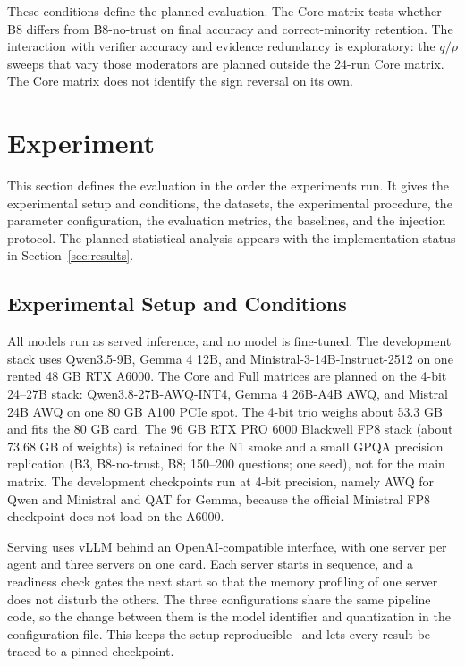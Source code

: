 \documentclass[a4paper,fleqn]{cas-sc}
\begin{document}
These conditions define the planned evaluation. The Core matrix tests whether B8 differs from B8-no-trust on final accuracy and correct-minority retention. The interaction with verifier accuracy and evidence redundancy is exploratory: the $q/\rho$ sweeps that vary those moderators are planned outside the 24-run Core matrix. The Core matrix does not identify the sign reversal on its own.

\clearpage

\section{Experiment}\label{sec4}

This section defines the evaluation in the order the experiments run. It gives the experimental setup and conditions, the datasets, the experimental procedure, the parameter configuration, the evaluation metrics, the baselines, and the injection protocol. The planned statistical analysis appears with the implementation status in Section~\ref{sec:results}.


\subsection{Experimental Setup and Conditions}

All models run as served inference, and no model is fine-tuned. The development stack uses Qwen3.5-9B, Gemma 4 12B, and Ministral-3-14B-Instruct-2512 on one rented 48 GB RTX A6000. The Core and Full matrices are planned on the 4-bit 24--27B stack: Qwen3.8-27B-AWQ-INT4, Gemma 4 26B-A4B AWQ, and Mistral 24B AWQ on one 80 GB A100 PCIe spot. The 4-bit trio weighs about 53.3 GB and fits the 80 GB card. The 96 GB RTX PRO 6000 Blackwell FP8 stack (about 73.68 GB of weights) is retained for the N1 smoke and a small GPQA precision replication (B3, B8-no-trust, B8; 150--200 questions; one seed), not for the main matrix. The development checkpoints run at 4-bit precision, namely AWQ for Qwen and Ministral and QAT for Gemma, because the official Ministral FP8 checkpoint does not load on the A6000.

Serving uses vLLM behind an OpenAI-compatible interface, with one server per agent and three servers on one card. Each server starts in sequence, and a readiness check gates the next start so that the memory profiling of one server does not disturb the others. The three configurations share the same pipeline code, so the change between them is the model identifier and quantization in the configuration file. This keeps the setup reproducible~\cite{pineau2021improving} and lets every result be traced to a pinned checkpoint.
\end{document}
